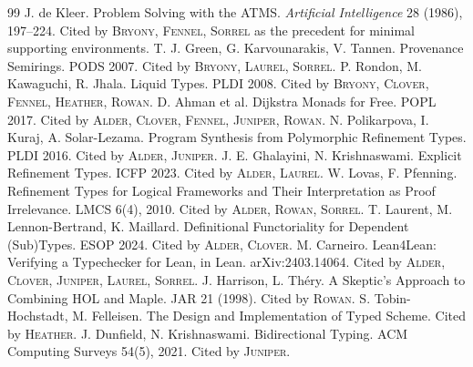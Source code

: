 \documentclass[11pt,a4paper]{article}
\newcommand{\Al}{\textsc{Alder}}
\newcommand{\Br}{\textsc{Bryony}}
\newcommand{\Cl}{\textsc{Clover}}
\newcommand{\Fe}{\textsc{Fennel}}
\newcommand{\He}{\textsc{Heather}}
\newcommand{\Ju}{\textsc{Juniper}}
\newcommand{\La}{\textsc{Laurel}}
\newcommand{\Ro}{\textsc{Rowan}}
\newcommand{\So}{\textsc{Sorrel}}
\theoremstyle{definition}
\theoremstyle{plain}
\begin{document}
\begin{thebibliography}{99}
 J. de Kleer. Problem Solving with the ATMS. \emph{Artificial Intelligence} 28 (1986), 197--224. Cited by \Br, \Fe, \So{} as the precedent for minimal supporting environments.
 T. J. Green, G. Karvounarakis, V. Tannen. Provenance Semirings. PODS 2007. Cited by \Br, \La, \So.
 P. Rondon, M. Kawaguchi, R. Jhala. Liquid Types. PLDI 2008. Cited by \Br, \Cl, \Fe, \He, \Ro.
 D. Ahman et al. Dijkstra Monads for Free. POPL 2017. Cited by \Al, \Cl, \Fe, \Ju, \Ro.
 N. Polikarpova, I. Kuraj, A. Solar-Lezama. Program Synthesis from Polymorphic Refinement Types. PLDI 2016. Cited by \Al, \Ju.
 J. E. Ghalayini, N. Krishnaswami. Explicit Refinement Types. ICFP 2023. Cited by \Al, \La.
 W. Lovas, F. Pfenning. Refinement Types for Logical Frameworks and Their Interpretation as Proof Irrelevance. LMCS 6(4), 2010. Cited by \Al, \Ro, \So.
 T. Laurent, M. Lennon-Bertrand, K. Maillard. Definitional Functoriality for Dependent (Sub)Types. ESOP 2024. Cited by \Al, \Cl.
 M. Carneiro. Lean4Lean: Verifying a Typechecker for Lean, in Lean. arXiv:2403.14064. Cited by \Al, \Cl, \Ju, \La, \So.
 J. Harrison, L. Th\'ery. A Skeptic's Approach to Combining HOL and Maple. JAR 21 (1998). Cited by \Ro.
 S. Tobin-Hochstadt, M. Felleisen. The Design and Implementation of Typed Scheme. Cited by \He.
 J. Dunfield, N. Krishnaswami. Bidirectional Typing. ACM Computing Surveys 54(5), 2021. Cited by \Ju.
\end{thebibliography}
\end{document}
